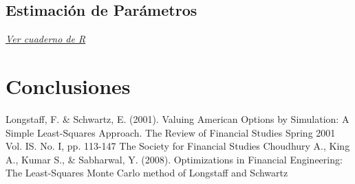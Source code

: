 \documentclass[12pt,reqno,letter]{article}
\begin{document}
	\subsection{Estimación de Parámetros}
	
	\textit{\href{https://www.dropbox.com/s/njszo4jprkzxhz6/estimacion_parametros_edp.pdf?dl=0}{Ver cuaderno de R}}
	
	\section{Conclusiones}\label{conclusiones}
	

	\begin{thebibliography}{9}
			 Longstaff, F. \& Schwartz, E. (2001). Valuing American Options by Simulation: A Simple Least-Squares Approach. The Review of Financial Studies Spring 2001 Vol. IS. No. I, pp. 113-147 The Society for Financial Studies
			 Choudhury A., King A., Kumar S., \& Sabharwal, Y. (2008). Optimizations in Financial Engineering: The Least-Squares Monte Carlo method of Longstaff and Schwartz
	\end{thebibliography}
	
	
	
\end{document}
